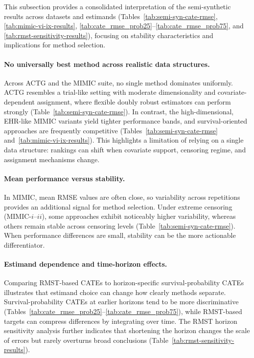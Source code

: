 \documentclass{article} %
\begin{document}
This subsection provides a consolidated interpretation of the semi-synthetic results across datasets and estimands (Tables~\ref{tab:semi-syn-cate-rmse}, \ref{tab:mimic-vi-ix-results}, \ref{tab:cate_rmse_prob25}--\ref{tab:cate_rmse_prob75}, and \ref{tab:rmst-sensitivity-results}), focusing on stability characteristics and implications for method selection.

\paragraph{No universally best method across realistic data structures.}
Across ACTG and the MIMIC suite, no single method dominates uniformly. ACTG resembles a trial-like setting with moderate dimensionality and covariate-dependent assignment, where flexible doubly robust estimators can perform strongly (Table~\ref{tab:semi-syn-cate-rmse}). In contrast, the high-dimensional, EHR-like MIMIC variants yield tighter performance bands, and survival-oriented approaches are frequently competitive (Tables~\ref{tab:semi-syn-cate-rmse} and~\ref{tab:mimic-vi-ix-results}). This highlights a limitation of relying on a single data structure: rankings can shift when covariate support, censoring regime, and assignment mechanisms change.

\paragraph{Mean performance versus stability.}
In MIMIC, mean RMSE values are often close, so variability across repetitions provides an additional signal for method selection. Under extreme censoring (MIMIC-$i$--$ii$), some approaches exhibit noticeably higher variability, whereas others remain stable across censoring levels (Table~\ref{tab:semi-syn-cate-rmse}). When performance differences are small, stability can be the more actionable differentiator.

\paragraph{Estimand dependence and time-horizon effects.}
Comparing RMST-based CATEs to horizon-specific survival-probability CATEs illustrates that estimand choice can change how clearly methods separate. Survival-probability CATEs at earlier horizons tend to be more discriminative (Tables~\ref{tab:cate_rmse_prob25}--\ref{tab:cate_rmse_prob75}), while RMST-based targets can compress differences by integrating over time. The RMST horizon sensitivity analysis further indicates that shortening the horizon changes the scale of errors but rarely overturns broad conclusions (Table~\ref{tab:rmst-sensitivity-results}).
\end{document}
